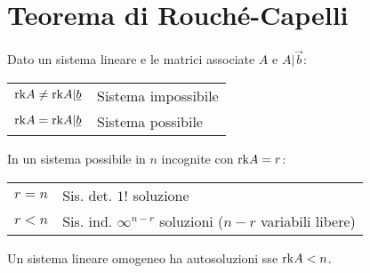 \section{Teorema di Rouché-Capelli}
Dato un sistema lineare e le matrici associate $A$ e $A|\vec{b}$:
\begin{tabular}{ll}
	$\mathrm{rk} A \ne \mathrm{rk} A|\underline{b}$ & Sistema impossibile \\
	$\mathrm{rk} A = \mathrm{rk} A|\underline{b}$ & Sistema possibile
\end{tabular}

In un sistema possibile in $n$ incognite con $\mathrm{rk} A = r$:
\begin{tabular}{ll}
	$r = n$ & Sis. det. $1!$ soluzione \\
	$r < n$ & Sis. ind. $\infty^{n-r}$ soluzioni ($n-r$ variabili libere) \\
\end{tabular}

Un sistema lineare omogeneo ha autosoluzioni sse $\mathrm{rk} A < n$.
